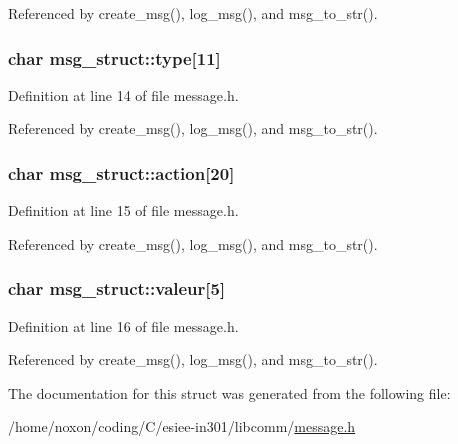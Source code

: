 Referenced by create\_\-msg(), log\_\-msg(), and msg\_\-to\_\-str().\hypertarget{structmsg__struct_b1bee85c89cf3c52f0a4343675f76038}{
\subsubsection{\setlength{\rightskip}{0pt plus 5cm}char {\bf msg\_\-struct::type}\mbox{[}11\mbox{]}}}
\label{structmsg__struct_b1bee85c89cf3c52f0a4343675f76038}




Definition at line 14 of file message.h.

Referenced by create\_\-msg(), log\_\-msg(), and msg\_\-to\_\-str().\hypertarget{structmsg__struct_6863e9ef8f00f38466c33643798b2652}{
\subsubsection{\setlength{\rightskip}{0pt plus 5cm}char {\bf msg\_\-struct::action}\mbox{[}20\mbox{]}}}
\label{structmsg__struct_6863e9ef8f00f38466c33643798b2652}




Definition at line 15 of file message.h.

Referenced by create\_\-msg(), log\_\-msg(), and msg\_\-to\_\-str().\hypertarget{structmsg__struct_388703005dfbdfb61b6c5eb72b25f535}{
\subsubsection{\setlength{\rightskip}{0pt plus 5cm}char {\bf msg\_\-struct::valeur}\mbox{[}5\mbox{]}}}
\label{structmsg__struct_388703005dfbdfb61b6c5eb72b25f535}




Definition at line 16 of file message.h.

Referenced by create\_\-msg(), log\_\-msg(), and msg\_\-to\_\-str().

The documentation for this struct was generated from the following file:\begin{CompactItemize}
\item 
/home/noxon/coding/C/esiee-in301/libcomm/\hyperlink{message_8h}{message.h}\end{CompactItemize}
